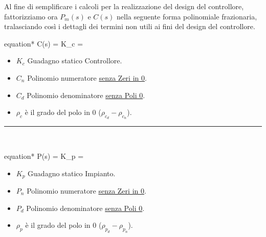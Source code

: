 \begin{oss} \label{oss:Fattorizzazione}
	Al fine di semplificare i calcoli per la realizzazione del design del controllore, fattorizziamo ora $ P_m(s) $ e $ C(s) $ nella seguente forma polinomiale frazionaria, tralasciando così i dettagli dei termini non utili ai fini del design del controllore.\\[0mm]
	\begin{vwcol}[widths={9cm,4cm}, sep=0mm, rule=0px]
		\vspace{-8mm}
		\begin{empheq}[box=\mathStep]{equation*}
			C(s) = K_c \cdot {} =
			 \cdot {}
		\end{empheq}
		\newpage
		\begin{spacing}{1.25}
			{\scriptsize
				\begin{itemize}[itemsep=-1mm,leftmargin=6mm]
					\item $ K_c $ Guadagno statico Controllore.
					\item $ C_n $ Polinomio numeratore \underline{senza Zeri in 0}.
					\item $ C_d $ Polinomio denominatore \underline{senza Poli 0}.
					\item $ \rho_c $ è il grado del polo in 0 ($ \rho_{c_d} - \rho_{c_n} $).
				\end{itemize}
			}
		\end{spacing}
	\end{vwcol}

	\noindent\rule[0.5ex]{\linewidth}{0.5pt}\\[0mm]

	\begin{vwcol}[widths={9cm,4cm}, sep=0mm, rule=0px]
		\vspace{-10mm}
		\begin{empheq}[box=\mathStep]{equation*}
			P(s) = K_p \cdot {} =
			 \cdot {}
		\end{empheq}
		\newpage
		\begin{spacing}{1.25}
			{\scriptsize
				\begin{itemize}[itemsep=-1mm,leftmargin=6mm]
					\item $ K_p $ Guadagno statico Impianto.
					\item $ P_n $ Polinomio numeratore \underline{senza Zeri in 0}.
					\item $ P_d $ Polinomio denominatore \underline{senza Poli 0}.
					\item $ \rho_p $ è il grado del polo in 0 ($ \rho_{p_d} - \rho_{p_n} $).
				\end{itemize}
			}
		\end{spacing}
	\end{vwcol}
\end{oss}
